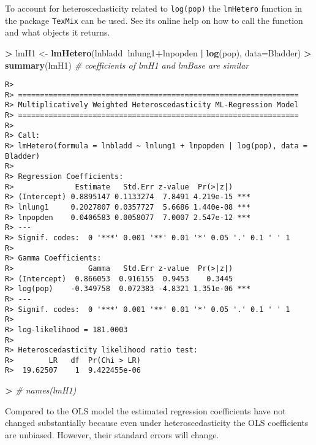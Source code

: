 \documentclass[
]{article}
\newenvironment{Shaded}{\begin{snugshade}}{\end{snugshade}}
\newcommand{\CommentTok}[1]{\textcolor[rgb]{0.56,0.35,0.01}{\textit{#1}}}
\newcommand{\DataTypeTok}[1]{\textcolor[rgb]{0.13,0.29,0.53}{#1}}
\newcommand{\KeywordTok}[1]{\textcolor[rgb]{0.13,0.29,0.53}{\textbf{#1}}}
\newcommand{\NormalTok}[1]{#1}
\newcommand{\OperatorTok}[1]{\textcolor[rgb]{0.81,0.36,0.00}{\textbf{#1}}}
\newcommand{\StringTok}[1]{\textcolor[rgb]{0.31,0.60,0.02}{#1}}
\begin{document}
To account for heteroscedasticity related to \texttt{log(pop)} the
\texttt{lmHetero} function in the package \texttt{TexMix} can be used.
See its online help on how to call the function and what objects it
returns.

\begin{Shaded}
\begin{Highlighting}[]
\OperatorTok{>}\StringTok{ }\NormalTok{lmH1 <-}\StringTok{ }\KeywordTok{lmHetero}\NormalTok{(lnbladd}\OperatorTok{~}\NormalTok{lnlung1}\OperatorTok{+}\NormalTok{lnpopden }\OperatorTok{|}\StringTok{ }\KeywordTok{log}\NormalTok{(pop), }\DataTypeTok{data=}\NormalTok{Bladder)}
\OperatorTok{>}\StringTok{ }\KeywordTok{summary}\NormalTok{(lmH1)                         }\CommentTok{# coefficients of lmH1 and lmBase are similar}
\end{Highlighting}
\end{Shaded}

\begin{verbatim}
R> 
R> ================================================================
R> Multiplicatively Weighted Heteroscedasticity ML-Regression Model
R> ================================================================
R> 
R> Call:
R> lmHetero(formula = lnbladd ~ lnlung1 + lnpopden | log(pop), data = Bladder)
R> 
R> Regression Coefficients:
R>              Estimate   Std.Err z-value  Pr(>|z|)    
R> (Intercept) 0.8895147 0.1133274  7.8491 4.219e-15 ***
R> lnlung1     0.2027807 0.0357727  5.6686 1.440e-08 ***
R> lnpopden    0.0406583 0.0058077  7.0007 2.547e-12 ***
R> ---
R> Signif. codes:  0 '***' 0.001 '**' 0.01 '*' 0.05 '.' 0.1 ' ' 1
R> 
R> Gamma Coefficients:
R>                 Gamma   Std.Err z-value  Pr(>|z|)    
R> (Intercept)  0.866053  0.916155  0.9453    0.3445    
R> log(pop)    -0.349758  0.072383 -4.8321 1.351e-06 ***
R> ---
R> Signif. codes:  0 '***' 0.001 '**' 0.01 '*' 0.05 '.' 0.1 ' ' 1
R> 
R> log-likelihood = 181.0003 
R> 
R> Heteroscedasticity likelihood ratio test:
R>        LR   df  Pr(Chi > LR)
R>  19.62507    1  9.422455e-06
\end{verbatim}

\begin{Shaded}
\begin{Highlighting}[]
\OperatorTok{>}\StringTok{ }\CommentTok{# names(lmH1)}
\end{Highlighting}
\end{Shaded}

Compared to the OLS model the estimated regression coefficients have not
changed substantially because even under heteroscedasticity the OLS
coefficients are unbiased. However, their standard errors will change.
\end{document}
